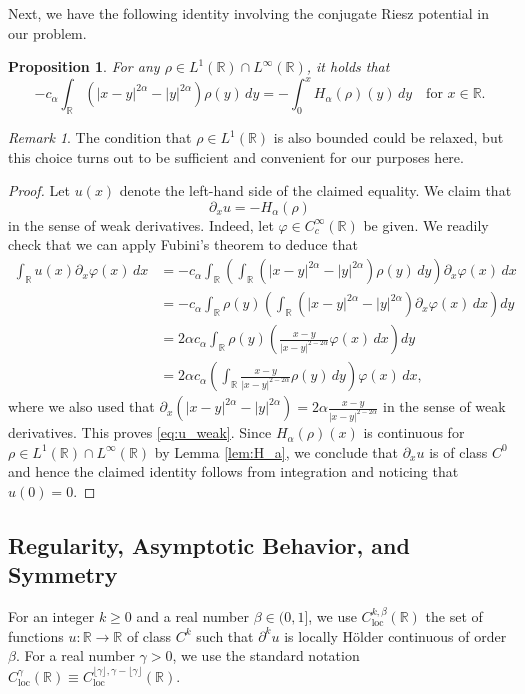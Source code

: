 \documentclass[reqno,10pt,a4paper]{amsart}
\newtheorem{prop}{Proposition}[section]
\theoremstyle{definition}
\theoremstyle{definition}
\theoremstyle{remark}
\theoremstyle{remark}
\newtheorem*{remark*}{Remark}
\numberwithin{equation}{section}
\newcommand{\R}{\mathbb{R}}
\newcommand{\pt}{\partial}
\newcommand{\be}{\begin{equation}}
\newcommand{\ee}{\end{equation}}
\renewcommand{\phi}{\varphi}
\newcommand{\Cloc}{C_{\mathrm{loc}}}
\begin{document}
Next, we have the following identity involving the conjugate Riesz potential in our problem.  
\begin{prop} \label{prop:riesz_integral}
For any $\rho \in L^1(\R) \cap L^\infty(\R)$, it holds that
$$
-c_\alpha \int_{\R} (|x-y|^{2 \alpha} - |y|^{2 \alpha}) \rho(y) \, dy = -\int_0^x H_\alpha(\rho)(y) \, dy \quad \mbox{for $x \in \R$}.
$$
\end{prop}

\begin{remark*}
The condition that $\rho \in L^1(\R)$ is also bounded could be relaxed, but this choice turns out to be sufficient and convenient for our purposes here. 
\end{remark*}

\begin{proof}
Let $u(x)$ denote the left-hand side of the claimed equality. We claim that
\be \label{eq:u_weak}
\pt_x u = -H_\alpha(\rho)
\ee
in the sense of weak derivatives. Indeed, let $\phi \in C^\infty_c(\R)$ be given. We readily check that we can apply Fubini's theorem to deduce that
\begin{align*}
\int_\R u(x) \pt_x \phi(x) \, dx &= -c_\alpha \int_\R \left ( \int_\R (|x-y|^{2 \alpha} - |y|^{2 \alpha}) \rho(y) \, dy \right ) \pt_x \phi(x) \, dx \\
& = -c_\alpha \int_\R \rho(y) \left ( \int_{\R} (|x-y|^{2 \alpha}- |y|^{2 \alpha}) \pt_x \phi(x) \, dx \right ) dy \\
& = 2 \alpha c_\alpha \int_{\R} \rho(y) \left ( \frac{x-y}{|x-y|^{2-2 \alpha}}  \phi(x) \, dx \right ) dy \\
& = 2 \alpha c_\alpha \left ( \int_{\R} \frac{x-y}{|x-y|^{2-2\alpha}} \rho(y) \,dy \right ) \phi(x) \, dx,
\end{align*}
where we also used that $\pt_x (|x-y|^{2 \alpha}- |y|^{2 \alpha}) = 2 \alpha \frac{x-y}{|x-y|^{2-2 \alpha}}$ in the sense of weak derivatives. This proves \eqref{eq:u_weak}. Since $H_\alpha(\rho)(x)$ is continuous for $\rho \in L^1(\R) \cap L^\infty(\R)$ by Lemma \ref{lem:H_a}, we conclude that $\pt_x u$ is of class $C^0$ and hence the claimed identity follows from integration and noticing that $u(0)=0$.
\end{proof}

\subsection{Regularity, Asymptotic Behavior, and Symmetry}

For an integer $k  \geq 0$ and a real number $\beta \in (0,1]$, we use $\Cloc^{k,\beta}(\R)$ the set of functions $u : \R \to \R$ of class $C^k$ such that $\pt^k u$ is locally H\"older continuous of order $\beta$. For a real number $\gamma > 0$, we use the standard notation $\Cloc^\gamma(\R) \equiv \Cloc^{\lfloor \gamma \rfloor, \gamma- \lfloor \gamma \rfloor}(\R)$.
\end{document}
